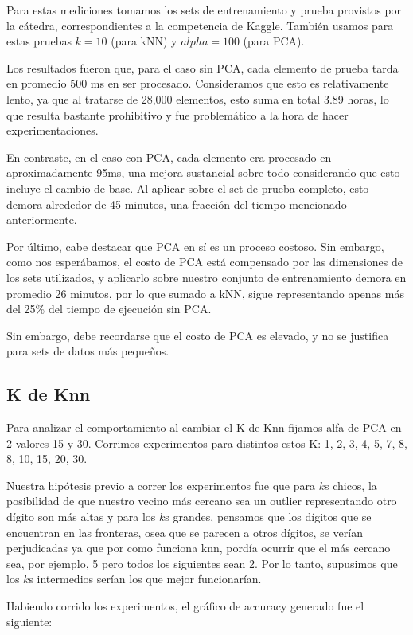 Para estas mediciones tomamos los sets de entrenamiento y prueba provistos por la cátedra, correspondientes a la competencia de Kaggle. También usamos para estas pruebas $k = 10$ (para kNN) y $alpha = 100$ (para PCA). 

Los resultados fueron que, para el caso sin PCA, cada elemento de prueba tarda en promedio 500 ms en ser procesado. Consideramos que esto es relativamente lento, ya que al tratarse de 28,000 elementos, esto suma en total 3.89 horas, lo que resulta bastante prohibitivo y fue problemático a la hora de hacer experimentaciones.

En contraste, en el caso con PCA, cada elemento era procesado en aproximadamente 95ms, una mejora sustancial sobre todo considerando que esto incluye el cambio de base. Al aplicar sobre el set de prueba completo, esto demora alrededor de 45 minutos, una fracción del tiempo mencionado anteriormente.

Por último, cabe destacar que PCA en sí es un proceso costoso. Sin embargo, como nos esperábamos, el costo de PCA está compensado por las dimensiones de los sets utilizados, y aplicarlo sobre nuestro conjunto de entrenamiento demora en promedio 26 minutos, por lo que sumado a kNN, sigue representando apenas más del 25\% del tiempo de ejecución sin PCA.

Sin embargo, debe recordarse que el costo de PCA es elevado, y no se justifica para sets de datos más pequeños.

\subsection{K de Knn}

Para analizar el comportamiento al cambiar el K de Knn fijamos alfa de PCA en 2 valores 15 y 30. Corrimos experimentos para distintos estos K: 1, 2, 3, 4, 5, 7, 8, 8, 10, 15, 20, 30.

Nuestra hipótesis previo a correr los experimentos fue que para $k$s chicos, la posibilidad de que nuestro vecino más cercano sea un outlier representando otro dígito son más altas y para los $k$s grandes, pensamos que los dígitos que se encuentran en las fronteras, osea que se parecen a otros dígitos, se verían perjudicadas ya que por como funciona knn, pordía ocurrir que el más cercano sea, por ejemplo, 5 pero todos los siguientes sean 2. Por lo tanto, supusimos que los $k$s intermedios serían los que mejor funcionarían.

Habiendo corrido los experimentos, el gráfico de accuracy generado fue el siguiente:

